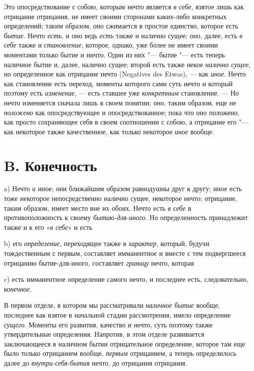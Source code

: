 Это опосредствование с собою, которым нечто является
{\em в себе}, взятое лишь как отрицание отрицания, не
имеет своими сторонами каких-либо конкретных определений; таким образом,
оно сжимается в простое единство, которое есть
{\em бытие}. Нечто {\em есть}, и
оно ведь {\em есть} также и налично сущее; оно, далее,
есть {\em в себе} также и
{\em становление}, которое, однако, уже более не имеет
своими моментами только бытие и ничто. Один из них "--- бытие "--- есть теперь
наличное бытие и, далее, налично сущее; второй есть также некое
{\em налично сущее}, но определенное как отрицание
нечто (Negatives des Etwas), — как {\em иное}.
Нечто как становление есть переход, моменты которого сами суть нечто и
который поэтому есть {\em изменение}, — есть ставшее
уже {\em конкретным} становление. — Но нечто изменяется
сначала лишь в своем понятии; оно, таким образом, еще не
{\em положено} как опосредствующее и опосредствованное;
пока что оно положено, как просто сохраняющее себя в своем соотношении с
собою, а отрицание его "--- как некоторое также качественное, как только
некоторое {\em иное} вообще.

\section[B. Конечность]{B. Конечность}
a) Нечто {\em и} иное; они ближайшим образом
равнодушны друг к другу; иное есть тоже некоторое непосредственно налично
сущее, некоторое нечто; отрицание, таким образом, имеет место вне их обоих.
Нечто есть {\em в себе} в противоположность к своему
{\em бытию-для-иного}. Но определенность принадлежит
также и к его «{\em в себе}» и есть

b) его {\em определение}, переходящее также в
{\em характер}, который, будучи
тождественным с первым, составляет имманентное и вместе с тем подвергшееся
отрицанию бытие-для-иного, составляет {\em границу}
нечто, которая

c) есть имманентное определение самого нечто, и последнее есть,
следовательно, {\em конечное}.

В первом отделе, в котором мы рассматривали
{\em наличное бытие} вообще, последнее как взятое в
начальной стадии рассмотрения, имело определение
{\em сущего}. Моменты его развития, качество и нечто,
суть поэтому также утвердительные определения. Напротив, в этом отделе
развивается заключающееся в наличном бытии отрицательное определение,
которое там еще было только отрицанием вообще,
{\em первым} отрицанием, а теперь определилось далее до
{\em внутри-себя-бытия} нечто, до отрицания отрицания.

